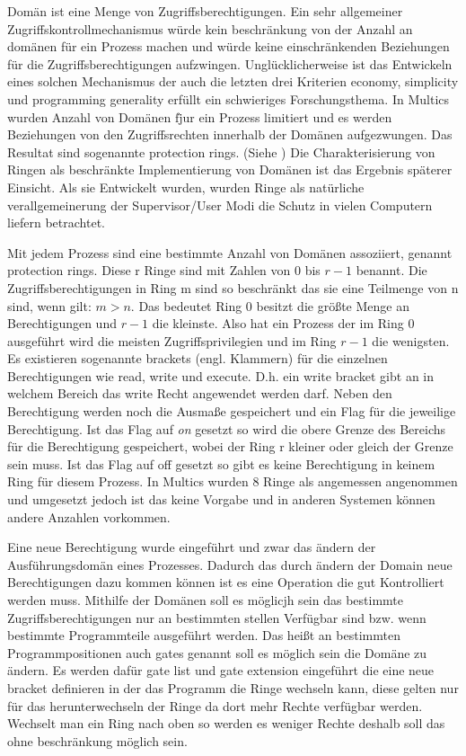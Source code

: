 \documentclass[9pt,technote]{IEEEtran}
\begin{document}
    Dom\"an ist eine Menge von Zugriffsberechtigungen. Ein sehr allgemeiner Zugriffskontrollmechanismus w\"urde kein beschr\"ankung von der Anzahl an
    dom\"anen f\"ur ein Prozess machen und w\"urde keine einschr\"ankenden Beziehungen f\"ur die Zugriffsberechtigungen aufzwingen.
    Ungl\"ucklicherweise ist das Entwickeln eines solchen Mechanismus der auch die letzten drei Kriterien economy, simplicity und programming generality
    erf\"ullt ein schwieriges Forschungsthema.  In Multics wurden Anzahl von Dom\"anen f\"jur ein Prozess limitiert und es werden Beziehungen von den Zugriffsrechten innerhalb
    der Dom\"anen aufgezwungen. Das Resultat sind sogenannte protection rings. (Siehe \cite[S. 160]{inproc:protec-rings}) 
    Die Charakterisierung von Ringen als beschr\"ankte Implementierung von Dom\"anen ist das Ergebnis sp\"aterer Einsicht. 
    Als sie Entwickelt wurden, wurden Ringe als nat\"urliche verallgemeinerung der Supervisor/User Modi die Schutz in vielen Computern liefern betrachtet.
    
    Mit jedem Prozess sind eine bestimmte Anzahl von Dom\"anen assoziiert, genannt protection rings. Diese r Ringe sind mit Zahlen von $0$ bis $r - 1$ benannt.
    Die Zugriffsberechtigungen in Ring m sind so beschr\"ankt das sie eine Teilmenge von n sind, wenn gilt: $m > n$. Das bedeutet
    Ring $0$ besitzt die gr\"o\ss te Menge an Berechtigungen und $r-1$ die kleinste. Also hat ein Prozess der im Ring $0$ ausgef\"uhrt wird
    die meisten Zugriffsprivilegien und im Ring $r-1$ die wenigsten. Es existieren sogenannte brackets (engl. Klammern) f\"ur die einzelnen Berechtigungen
    wie read, write und execute. D.h. ein write bracket gibt an in welchem Bereich das write Recht angewendet werden darf. Neben den 
    Berechtigung werden noch die Ausma\ss e gespeichert und ein Flag f\"ur die jeweilige Berechtigung. Ist das Flag auf \textit{on} gesetzt 
    so wird die obere Grenze des Bereichs f\"ur die Berechtigung gespeichert, wobei der Ring r kleiner oder gleich der Grenze sein muss.
    Ist das Flag auf off gesetzt so gibt es keine Berechtigung in keinem Ring f\"ur diesem Prozess. In Multics wurden 8 Ringe als angemessen 
    angenommen und umgesetzt jedoch ist das keine Vorgabe und in anderen Systemen k\"onnen andere Anzahlen vorkommen.
    
    Eine neue Berechtigung wurde eingef\"uhrt und zwar das \"andern der Ausf\"uhrungsdom\"an eines Prozesses.
    Dadurch das durch \"andern der Domain neue Berechtigungen dazu kommen k\"onnen ist es eine Operation die gut Kontrolliert werden muss.
    Mithilfe der Dom\"anen soll es m\"oglicjh sein das bestimmte Zugriffsberechtigungen nur an bestimmten stellen Verf\"ugbar  sind bzw. wenn bestimmte Programmteile 
    ausgef\"uhrt werden. Das hei\ss t an bestimmten Programmpositionen auch gates genannt soll es m\"oglich sein die Dom\"ane zu \"andern.
    Es werden daf\"ur gate list und gate extension eingef\"uhrt die eine neue bracket definieren in der das Programm die Ringe wechseln kann, diese
    gelten nur f\"ur das herunterwechseln der Ringe da dort mehr Rechte verf\"ugbar werden. Wechselt man ein Ring nach oben so werden es weniger Rechte deshalb
    soll das ohne beschr\"ankung m\"oglich sein. 
    
\end{document}
